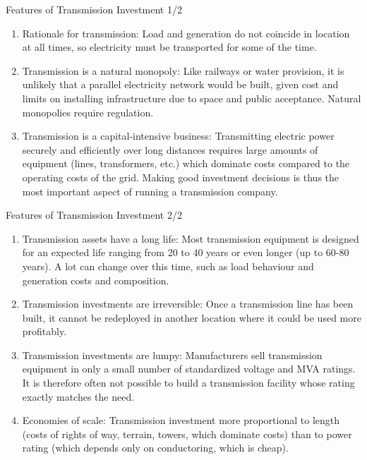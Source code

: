 \documentclass[10pt,dvipsnames]{beamer}
\let\olditem\item
\renewcommand{\item}{%
\olditem\vspace{5pt}}
\begin{document}
\begin{frame}{Features of Transmission Investment 1/2}


  \begin{enumerate}
  \item \alert{Rationale for transmission}: Load and generation do not coincide in location at all times, so electricity must be transported for some of the time.
  \item \alert{Transmission is a natural monopoly}: Like railways or water provision, it is unlikely that a parallel electricity network would be built, given cost and limits on installing infrastructure due to space and public acceptance. Natural monopolies require \alert{regulation}.
  \item \alert{Transmission is a capital-intensive business}:
    Transmitting electric power securely and efficiently over long
    distances requires large amounts of equipment (lines,
    transformers, etc.) which dominate costs compared to the operating
    costs of the grid. Making good investment decisions is thus the
    most important aspect of running a transmission company.
  \end{enumerate}



\end{frame}


\begin{frame}{Features of Transmission Investment 2/2}


  \begin{enumerate}
  \item \alert{Transmission assets have a long life}: Most
    transmission equipment is designed for an expected life ranging
    from 20 to 40 years or even longer (up to 60-80 years). A lot can
    change over this time, such as load behaviour and generation costs
    and composition.
  \item \alert{Transmission investments are irreversible}: Once a transmission line has been built, it
  cannot be redeployed in another location where it could be used more profitably.
  \item \alert{Transmission investments are lumpy}: Manufacturers sell transmission equipment in
    only a small number of standardized voltage and MVA ratings. It is therefore often not
    possible to build a transmission facility whose rating exactly matches the need.
    \item \alert{Economies of scale}: Transmission investment more
      proportional to length (costs of rights of way, terrain, towers,
      which dominate costs) than to power rating (which depends only
      on conductoring, which is cheap).

  \end{enumerate}


\end{frame}
\end{document}
